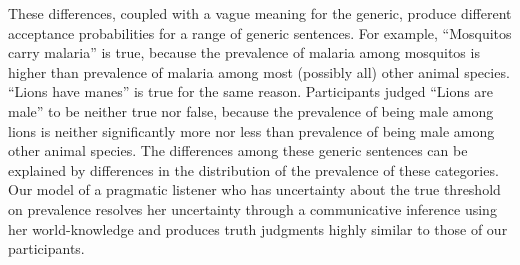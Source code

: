 \documentclass[10pt,letterpaper]{article}
\begin{document}
These differences, coupled with a vague meaning for the generic, produce different acceptance probabilities for a range of generic sentences. 
For example, ``Mosquitos carry malaria'' is true, because the prevalence of malaria among mosquitos is higher than prevalence of malaria among most (possibly all) other animal species. 
``Lions have manes'' is true for the same reason. 
Participants judged ``Lions are male'' to be neither true nor false, because the prevalence of being male among lions is neither significantly more nor less than prevalence of being male among other animal species. 
The differences among these generic sentences can be explained by differences in the distribution of the prevalence of these categories. 
Our model of a pragmatic listener who has uncertainty about the true threshold on prevalence resolves her uncertainty through a communicative inference using her world-knowledge and produces truth judgments highly similar to those of our participants.



\end{document}
